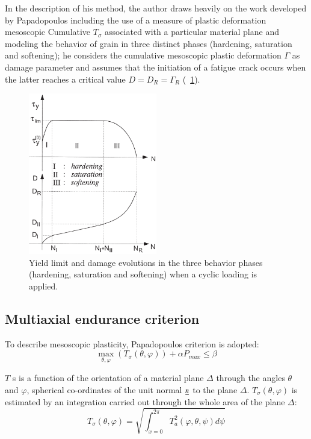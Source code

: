 \documentclass[3p,times,procedia,number]{elsarticle}
\newcommand{\figref}[1]{\figurename~\ref{#1}}
\begin{document}
In the description of his method, the author draws heavily on the work developed by
Papadopoulos including the use of a measure of plastic deformation mesoscopic
Cumulative $T_\sigma$ associated with a particular material plane and modeling the behavior of
grain in three distinct phases (hardening, saturation and softening); he considers the cumulative mesoscopic plastic deformation $\Gamma$ as damage parameter and assumes that the initiation of a fatigue crack occurs when the latter reaches a
critical value $D = D_R = \Gamma_R$ (\figref{3phases}). 
\begin{figure}[h!]
	\centering
	\includegraphics[width=0.5\textwidth]{figures//3phases.png} 
	\caption{Yield limit and damage evolutions in the three behavior phases (hardening, saturation and softening) when a cyclic loading	is applied.}
	\label{3phases}
\end{figure}

\subsection{Multiaxial endurance criterion}

To describe mesoscopic plasticity, Papadopoulos criterion is adopted:
\begin{equation}
\max\limits_{\theta,\varphi}(T_\sigma(\theta,\varphi))+\alpha P_{max}\leqslant \beta
	\label{papa}
\end{equation}

$T$ s is a function of the orientation of a material plane $\Delta$
through the angles $\theta$ and $\varphi$, spherical co-ordinates of the
unit normal $\uline{n}$ to the plane $\Delta$. $T_\sigma(\theta,\varphi)$ is estimated by an integration carried out
through the whole area of the plane $\Delta$:
\begin{equation}
T_\sigma(\theta,\varphi)=\sqrt{\int_{x=0}^{2\pi} T_a^2(\varphi,\theta,\psi)d\psi}
\label{Ta}
\end{equation}
\end{document}
